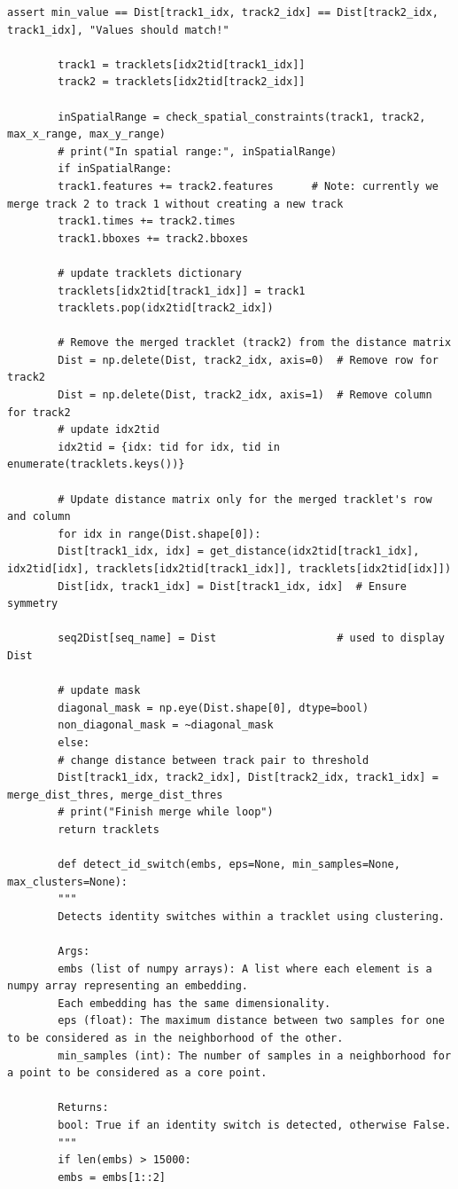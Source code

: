 \documentclass[12pt, a4paper, twoside]{article}
\begin{document}
\begin{lstlisting}[style=pythonstyle]
		assert min_value == Dist[track1_idx, track2_idx] == Dist[track2_idx, track1_idx], "Values should match!"
		
		track1 = tracklets[idx2tid[track1_idx]]
		track2 = tracklets[idx2tid[track2_idx]]
		
		inSpatialRange = check_spatial_constraints(track1, track2, max_x_range, max_y_range)
		# print("In spatial range:", inSpatialRange)
		if inSpatialRange:
		track1.features += track2.features      # Note: currently we merge track 2 to track 1 without creating a new track
		track1.times += track2.times
		track1.bboxes += track2.bboxes
		
		# update tracklets dictionary
		tracklets[idx2tid[track1_idx]] = track1
		tracklets.pop(idx2tid[track2_idx])
		
		# Remove the merged tracklet (track2) from the distance matrix
		Dist = np.delete(Dist, track2_idx, axis=0)  # Remove row for track2
		Dist = np.delete(Dist, track2_idx, axis=1)  # Remove column for track2
		# update idx2tid
		idx2tid = {idx: tid for idx, tid in enumerate(tracklets.keys())}
		
		# Update distance matrix only for the merged tracklet's row and column
		for idx in range(Dist.shape[0]):
		Dist[track1_idx, idx] = get_distance(idx2tid[track1_idx], idx2tid[idx], tracklets[idx2tid[track1_idx]], tracklets[idx2tid[idx]])
		Dist[idx, track1_idx] = Dist[track1_idx, idx]  # Ensure symmetry
		
		seq2Dist[seq_name] = Dist                   # used to display Dist
		
		# update mask
		diagonal_mask = np.eye(Dist.shape[0], dtype=bool)
		non_diagonal_mask = ~diagonal_mask
		else:
		# change distance between track pair to threshold
		Dist[track1_idx, track2_idx], Dist[track2_idx, track1_idx] = merge_dist_thres, merge_dist_thres
		# print("Finish merge while loop")
		return tracklets
		
		def detect_id_switch(embs, eps=None, min_samples=None, max_clusters=None):
		"""
		Detects identity switches within a tracklet using clustering.
		
		Args:
		embs (list of numpy arrays): A list where each element is a numpy array representing an embedding.
		Each embedding has the same dimensionality.
		eps (float): The maximum distance between two samples for one to be considered as in the neighborhood of the other.
		min_samples (int): The number of samples in a neighborhood for a point to be considered as a core point.
		
		Returns:
		bool: True if an identity switch is detected, otherwise False.
		"""
		if len(embs) > 15000:
		embs = embs[1::2]
		

\end{lstlisting}
\end{document}
